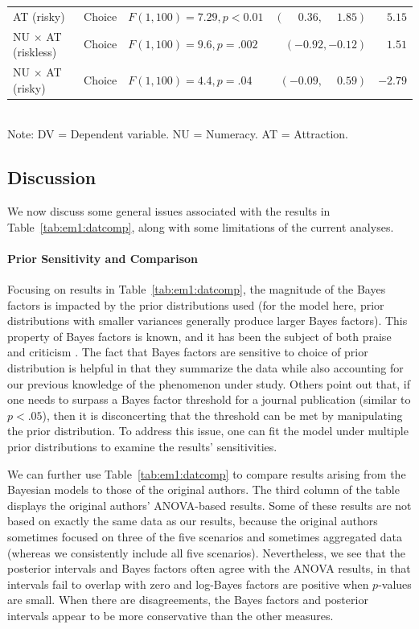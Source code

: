 \begin{table}
{\begin{tabular}{lllrr}
    AT (risky)                & Choice        & $F(1, 100) =  7.29, p < 0.01$  &  $(\phantom{-}0.36,\phantom{-}1.85)$   & $ 5.15$ \\ %
    NU $\times$ AT (riskless) & Choice        & $F(1, 100) =  9.6,  p = .002$  &  $(          -0.92,          -0.12)$   & $ 1.51$ \\ %
    NU $\times$ AT (risky)    & Choice        & $F(1, 100) =  4.4,  p = .04$   &  $(          -0.09,\phantom{-}0.59)$   & $-2.79$ \\ \hline %
\end{tabular}}\\[6pt]
\noindent Note: DV = Dependent variable. NU = Numeracy. AT = Attraction.
\end{table}

\subsection{Discussion}
 We now discuss some general issues associated with the results in  Table~\ref{tab:em1:datcomp}, along with some limitations of the current analyses.  

\paragraph{Prior Sensitivity and Comparison} Focusing on results in Table~\ref{tab:em1:datcomp}, the magnitude of the Bayes factors is impacted by the prior distributions used (for the model here, prior distributions with smaller variances generally produce larger Bayes factors).   This property of Bayes factors is known, and it has been the subject of both praise and criticism \cite{liuait08,van10}.  The fact that Bayes factors are sensitive to choice of prior distribution is helpful in that they summarize the data while also accounting for our previous knowledge of the phenomenon under study.  Others point out that, if one needs to surpass a Bayes factor threshold for a journal publication (similar to $p<.05$), then it is disconcerting that the threshold can be met by manipulating the prior distribution.  To address this issue, one can fit the model under multiple prior distributions to examine the results' sensitivities.

We can further use Table~\ref{tab:em1:datcomp} to compare results arising from the Bayesian models to those of the original authors.  The third column of the table displays the original authors' ANOVA-based results.  Some of these results are not based on exactly the same data as our results, because the original authors sometimes focused on three of the five scenarios and sometimes aggregated data (whereas we consistently include all five scenarios).  Nevertheless, we see that the posterior intervals and Bayes factors often agree with the ANOVA results, in that intervals fail to overlap with zero and log-Bayes factors are positive when $p$-values are small.  When there are disagreements, the Bayes factors and posterior intervals appear to be more conservative than the other measures.

